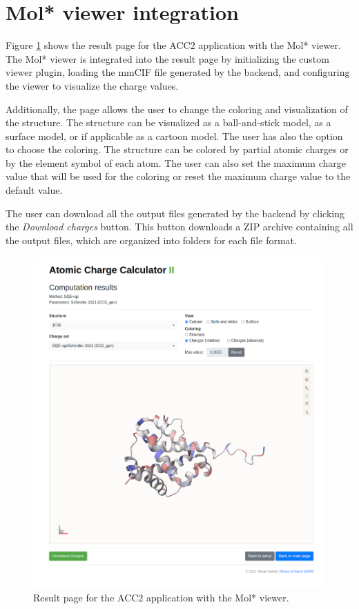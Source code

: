 \documentclass[
  digital,     %
  oneside,     %
  nosansbold,  %
  nocolorbold, %
  lof,         %
  lot,         %
]{fithesis4}
\begin{document}
\section{Mol* viewer integration}
\label{section:viewer_integration}

Figure \ref{fig:result_page} shows the result page for the ACC2 application with the Mol* viewer. The Mol* viewer is integrated into the result page by initializing the custom viewer plugin, loading the mmCIF file generated by the backend, and configuring the viewer to visualize the charge values.

Additionally, the page allows the user to change the coloring and visualization of the structure. The structure can be visualized as a ball-and-stick model, as a surface model, or if applicable as a cartoon model. The user has also the option to choose the coloring. The structure can be colored by partial atomic charges or by the element symbol of each atom. The user can also set the maximum charge value that will be used for the coloring or reset the maximum charge value to the default value.

The user can download all the output files generated by the backend by clicking the \textit{Download charges} button. This button downloads a ZIP archive containing all the output files, which are organized into folders for each file format.

\begin{figure}[htbp]
  \begin{center}
    \includegraphics[width=\textwidth]{figures/results-full.png}
  \end{center}
  \caption{Result page for the ACC2 application with the Mol* viewer.}
  \label{fig:result_page}
\end{figure}
\end{document}
